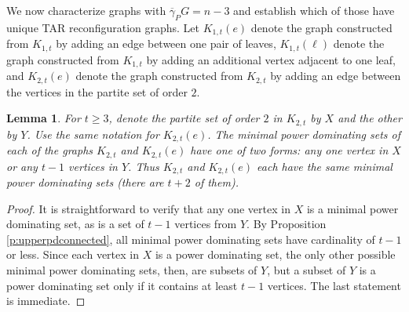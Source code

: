 \documentclass{article}
\def\red{\color{red}}
\numberwithin{figure}{section}   %
\newtheorem{lem}[thm]{Lemma}
\theoremstyle{definition}
\theoremstyle{definition}
\theoremstyle{definition}
\newcommand{\ol}{\overline}
\newcommand{\pd}{\gamma_P}
\newcommand{\pdbar}{\ol\pd}
\newcommand{\lh}[1]{{\textcolor{red}{[}\textcolor{red}{{LH: \em #1}]}}}
\newcommand{\bj}[1]{{\textcolor{red}{[}\textcolor{red}{{BJ: \em #1}]}}}
\begin{document}




We now characterize graphs with $\pdbar{G}=n-3$ and establish which of those have unique TAR reconfiguration graphs. Let $K_{1,t}(e)$ denote the graph constructed from $K_{1,t}$ by adding an edge between one pair of leaves,  $K_{1,t}(\ell)$ denote the graph constructed from $K_{1,t}$ by adding an additional vertex adjacent to one leaf, and  $K_{2,t}(e)$ denote the graph constructed from $K_{2,t}$ by adding an edge between  the vertices in the partite set of order $2$.
\begin{lem}\label{k2tminimalsets}
For $t\ge 3$,  denote the partite set of order $2$ in $K_{2,t}$ by $X$ and the other by $Y$.  Use the same notation for  $K_{2,t}(e)$. The minimal power dominating sets of each of the graphs $K_{2,t}$ and $K_{2,t}(e)$ have one of two forms: any one vertex in $X$ or any $t-1$ vertices in $Y$. 
Thus $K_{2,t}$ and $K_{2,t}(e)$ each have the same  minimal power dominating sets (there are $t+2$ of them). 
\end{lem}
\begin{proof}
It is straightforward to verify that any one vertex in $X$ is a minimal power dominating set, as is a set of $t-1$ vertices from $Y$.  By Proposition \ref{p:upperpdconnected}, all minimal power dominating sets have cardinality of $t-1$ or less.  Since each vertex in $X$ is a power dominating set, the only other possible minimal power dominating sets, then, are subsets of $Y$, but a subset of $Y$ is a power dominating set only if it contains at least $t-1$ vertices.  The last statement is immediate.
\end{proof}
\end{document}
